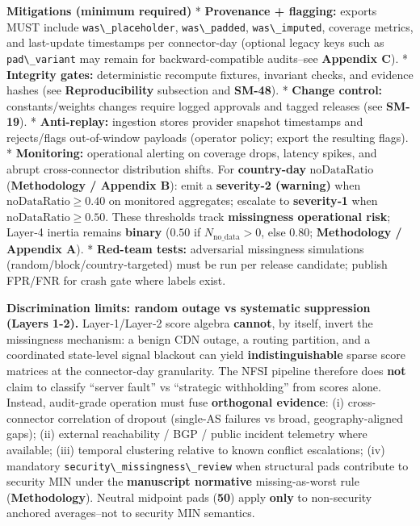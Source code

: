\documentclass[
  11pt,
  peerreview,journal,onecolumn]{IEEEtran}
\newcommand{\passthrough}[1]{#1}
\begin{document}
\textbf{Mitigations (minimum required)} * \textbf{Provenance +
flagging:} exports MUST include
\passthrough{\lstinline!was\_placeholder!},
\passthrough{\lstinline!was\_padded!},
\passthrough{\lstinline!was\_imputed!}, coverage metrics, and
last-update timestamps per connector-day (optional legacy keys such as
\passthrough{\lstinline!pad\_variant!} may remain for
backward-compatible audits--see \textbf{Appendix C}). *
\textbf{Integrity gates:} deterministic recompute fixtures, invariant
checks, and evidence hashes (see \textbf{Reproducibility} subsection and
\textbf{SM-48}). * \textbf{Change control:} constants/weights changes
require logged approvals and tagged releases (see \textbf{SM-19}). *
\textbf{Anti-replay:} ingestion stores provider snapshot timestamps and
rejects/flags out-of-window payloads (operator policy; export the
resulting flags). * \textbf{Monitoring:} operational alerting on
coverage drops, latency spikes, and abrupt cross-connector distribution
shifts. For \textbf{country-day} \(\mathrm{noDataRatio}\)
(\textbf{Methodology / Appendix B}): emit a \textbf{severity‑2
(warning)} when \(\mathrm{noDataRatio} \geq 0.40\) on monitored
aggregates; escalate to \textbf{severity‑1} when
\(\mathrm{noDataRatio} \geq 0.50\). These thresholds track
\textbf{missingness operational risk}; Layer‑4 inertia remains
\textbf{binary} (\(0.50\) if \(N_{\mathrm{no\_data}}>0\), else \(0.80\);
\textbf{Methodology / Appendix A}). * \textbf{Red-team tests:}
adversarial missingness simulations (random/block/country-targeted) must
be run per release candidate; publish FPR/FNR for crash gate where
labels exist.

\textbf{Discrimination limits: random outage vs systematic suppression
(Layers 1-2).} Layer‑1/Layer‑2 score algebra \textbf{cannot}, by itself,
invert the missingness mechanism: a benign CDN outage, a routing
partition, and a coordinated state-level signal blackout can yield
\textbf{indistinguishable} sparse score matrices at the connector-day
granularity. The NFSI pipeline therefore does \textbf{not} claim to
classify ``server fault'' vs ``strategic withholding'' from scores
alone. Instead, audit-grade operation must fuse \textbf{orthogonal
evidence}: (i) cross-connector correlation of dropout (single-AS
failures vs broad, geography-aligned gaps); (ii) external reachability /
BGP / public incident telemetry where available; (iii) temporal
clustering relative to known conflict escalations; (iv) mandatory
\passthrough{\lstinline!security\_missingness\_review!} when structural
pads contribute to security MIN under the \textbf{manuscript normative}
missing-as-worst rule (\textbf{Methodology}). Neutral midpoint pads
(\textbf{50}) apply \textbf{only} to non-security anchored averages--not
to security MIN semantics.
\end{document}
